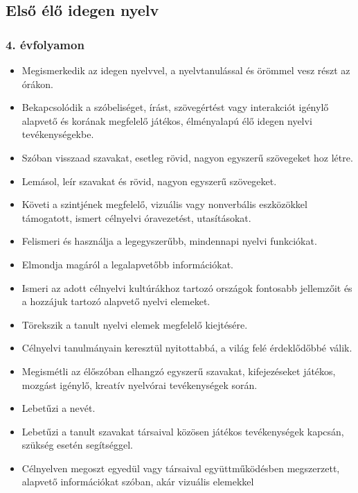 \hypertarget{elso-elo-idegen-nyelv}{%
\subsection{Első élő idegen nyelv}\label{elso-elo-idegen-nyelv}}

\hypertarget{evfolyamon-8}{%
\subsubsection{4. évfolyamon}\label{evfolyamon-8}}

\begin{itemize}
\item
  Megismerkedik az idegen nyelvvel, a nyelvtanulással és örömmel vesz
  részt az órákon.
\item
  Bekapcsolódik a szóbeliséget, írást, szövegértést vagy interakciót
  igénylő alapvető és korának megfelelő játékos, élményalapú élő idegen
  nyelvi tevékenységekbe.
\item
  Szóban visszaad szavakat, esetleg rövid, nagyon egyszerű szövegeket
  hoz létre.
\item
  Lemásol, leír szavakat és rövid, nagyon egyszerű szövegeket.
\item
  Követi a szintjének megfelelő, vizuális vagy nonverbális eszközökkel
  támogatott, ismert célnyelvi óravezetést, utasításokat.
\item
  Felismeri és használja a legegyszerűbb, mindennapi nyelvi funkciókat.
\item
  Elmondja magáról a legalapvetőbb információkat.
\item
  Ismeri az adott célnyelvi kultúrákhoz tartozó országok fontosabb
  jellemzőit és a hozzájuk tartozó alapvető nyelvi elemeket.
\item
  Törekszik a tanult nyelvi elemek megfelelő kiejtésére.
\item
  Célnyelvi tanulmányain keresztül nyitottabbá, a világ felé
  érdeklődőbbé válik.
\item
  Megismétli az élőszóban elhangzó egyszerű szavakat, kifejezéseket
  játékos, mozgást igénylő, kreatív nyelvórai tevékenységek során.
\item
  Lebetűzi a nevét.
\item
  Lebetűzi a tanult szavakat társaival közösen játékos tevékenységek
  kapcsán, szükség esetén segítséggel.
\item
  Célnyelven megoszt egyedül vagy társaival együttműködésben
  megszerzett, alapvető információkat szóban, akár vizuális elemekkel

\end{itemize}
